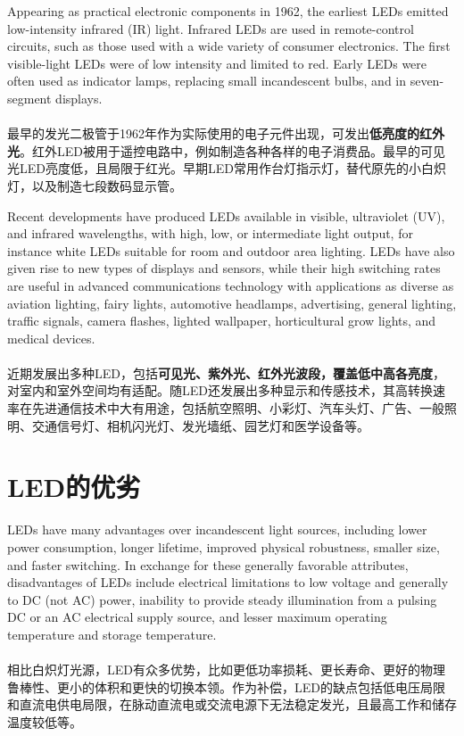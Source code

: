 \begin{slide}
  Appearing as practical electronic components in 1962, the earliest LEDs emitted low-intensity infrared (IR) light. Infrared LEDs are used in remote-control circuits, such as those used with a wide variety of consumer electronics. The first visible-light LEDs were of low intensity and limited to red. Early LEDs were often used as indicator lamps, replacing small incandescent bulbs, and in seven-segment displays.
  \\~\\
  最早的发光二极管于1962年作为实际使用的电子元件出现，可发出\textbf{低亮度的红外光}。红外LED被用于遥控电路中，例如制造各种各样的电子消费品。最早的可见光LED亮度低，且局限于红光。早期LED常用作台灯指示灯，替代原先的小白炽灯，以及制造七段数码显示管。
\end{slide}

\begin{slide}
  Recent developments have produced LEDs available in visible, ultraviolet (UV), and infrared wavelengths, with high, low, or intermediate light output, for instance white LEDs suitable for room and outdoor area lighting. LEDs have also given rise to new types of displays and sensors, while their high switching rates are useful in advanced communications technology with applications as diverse as aviation lighting, fairy lights, automotive headlamps, advertising, general lighting, traffic signals, camera flashes, lighted wallpaper, horticultural grow lights, and medical devices.
  \\~\\
  近期发展出多种LED，包括\textbf{可见光、紫外光、红外光波段，覆盖低中高各亮度}，对室内和室外空间均有适配。随LED还发展出多种显示和传感技术，其高转换速率在先进通信技术中大有用途，包括航空照明、小彩灯、汽车头灯、广告、一般照明、交通信号灯、相机闪光灯、发光墙纸、园艺灯和医学设备等。
\end{slide}

\section{LED的优劣}

\begin{slide}
  LEDs have many advantages over incandescent light sources, including lower power consumption, longer lifetime, improved physical robustness, smaller size, and faster switching. In exchange for these generally favorable attributes, disadvantages of LEDs include electrical limitations to low voltage and generally to DC (not AC) power, inability to provide steady illumination from a pulsing DC or an AC electrical supply source, and lesser maximum operating temperature and storage temperature.
  \\~\\
  相比白炽灯光源，LED有众多优势，比如更低功率损耗、更长寿命、更好的物理鲁棒性、更小的体积和更快的切换本领。作为补偿，LED的缺点包括低电压局限和直流电供电局限，在脉动直流电或交流电源下无法稳定发光，且最高工作和储存温度较低等。
\end{slide}

